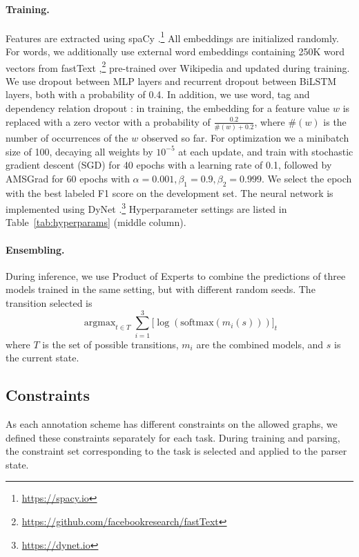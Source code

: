 \documentclass[11pt,a4paper]{article}
\DeclareMathOperator*{\argmax}{argmax}
\begin{document}
\paragraph{Training.}
Features are extracted using spaCy \cite{spacy2}.\footnote{\url{https://spacy.io}}
All embeddings are initialized randomly.
For words, we additionally use external word embeddings containing 250K word vectors from fastText
\cite{bojanowski2016enriching},\footnote{\url{https://github.com/facebookresearch/fastText}}
pre-trained over Wikipedia and updated during training.
We use dropout \cite{srivastava2014dropout} between MLP layers and recurrent dropout
\cite{NIPS2016_6241} between BiLSTM layers, both with a probability of 0.4.
In addition, we use word, tag and dependency relation dropout \cite{kiperwasser2016simple}:
in training, the embedding for a feature value $w$ is replaced with a zero vector
with a probability of $\frac{0.2}{\#(w)+0.2}$, where $\#(w)$ is the number of occurrences of the
$w$ observed so far.
For optimization we a minibatch size of 100, decaying all weights by $10^{-5}$ at each update,
and train with stochastic gradient descent (SGD) for 40 epochs with a learning
rate of 0.1, followed by AMSGrad \cite{j.2018on} for 60 epochs with
$\alpha=0.001,\beta_1=0.9,\beta_2=0.999$.
We select the epoch with the best labeled F1 score on the development set.
The neural network is implemented using DyNet \cite{neubig2017dynet}.\footnote{\url{https://dynet.io}}
Hyperparameter settings are listed in Table~\ref{tab:hyperparams} (middle column).

\paragraph{Ensembling.}
During inference, we use Product of Experts \cite[PoE; ][]{hinton2002training} to combine the predictions
of three models trained in the same setting, but with different random seeds. The transition selected is
\[
\argmax_{t\in T}\sum_{i=1}^3\big[\log(\mathrm{softmax}(m_i(s)))\big]_t
\]
where $T$ is the set of possible transitions, $m_i$ are the combined models, and $s$ is the current state.



\subsection{Constraints}

As each annotation scheme has different constraints on the allowed graphs,
we defined these constraints separately for each task.
During training and parsing, the constraint set corresponding to the task is
selected and applied to the parser state.
\end{document}
